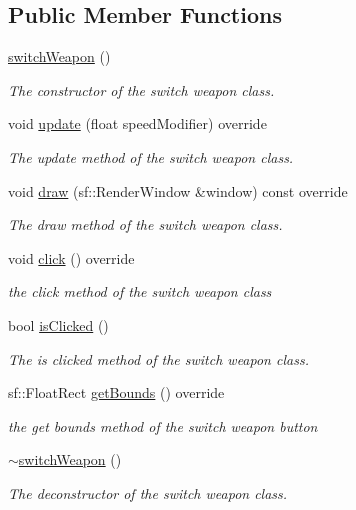 \subsection*{Public Member Functions}
\begin{DoxyCompactItemize}
\item 
\hyperlink{classswitch_weapon_a28db13e2cf535856e6df546ff8275b69}{switch\+Weapon} ()
\begin{DoxyCompactList}\small\item\em The constructor of the switch weapon class. \end{DoxyCompactList}\item 
void \hyperlink{classswitch_weapon_a63fe71ba783dce920b6180efb2258735}{update} (float speed\+Modifier) override
\begin{DoxyCompactList}\small\item\em The update method of the switch weapon class. \end{DoxyCompactList}\item 
void \hyperlink{classswitch_weapon_a1974ebf68ea94cfeabfb2bc8b3a97b37}{draw} (sf\+::\+Render\+Window \&window) const override
\begin{DoxyCompactList}\small\item\em The draw method of the switch weapon class. \end{DoxyCompactList}\item 
void \hyperlink{classswitch_weapon_a8b848f4f3d33cadf233c693861164f29}{click} () override
\begin{DoxyCompactList}\small\item\em the click method of the switch weapon class \end{DoxyCompactList}\item 
bool \hyperlink{classswitch_weapon_a12cbca1c7d8c181293ecb53b64c88a1b}{is\+Clicked} ()
\begin{DoxyCompactList}\small\item\em The is clicked method of the switch weapon class. \end{DoxyCompactList}\item 
sf\+::\+Float\+Rect \hyperlink{classswitch_weapon_ab6fb2ee5b59c1cfd6130eb5fd51f39ee}{get\+Bounds} () override
\begin{DoxyCompactList}\small\item\em the get bounds method of the switch weapon button \end{DoxyCompactList}\item 
\hyperlink{classswitch_weapon_a69056567f015667649a4f91984f55032}{$\sim$switch\+Weapon} ()
\begin{DoxyCompactList}\small\item\em The deconstructor of the switch weapon class. \end{DoxyCompactList}\end{DoxyCompactItemize}
